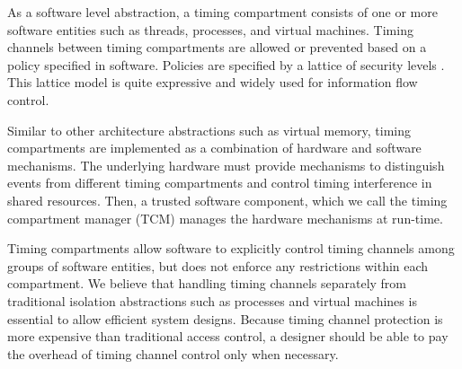 As a software level abstraction, a timing compartment consists of one or more 
software entities such as threads, processes, and virtual machines.  Timing 
channels between timing compartments are allowed or prevented based on a policy 
specified in software.  Policies are specified by a lattice of security levels
\cite{denning}.
This lattice model is quite expressive and widely used for information flow 
control. 


Similar to other architecture abstractions such as virtual memory,
timing compartments are implemented as a combination of hardware and software
mechanisms. The underlying hardware must provide mechanisms to distinguish
events from different timing compartments and control timing interference in 
shared resources. Then, a trusted software component, which we call the timing 
compartment manager (TCM) manages the hardware mechanisms at run-time.


Timing compartments allow software to explicitly control timing channels
among groups of software entities, but does not enforce any restrictions within
each compartment. We believe that handling timing channels separately from
traditional isolation abstractions such as processes and virtual machines is 
essential to allow efficient system designs. Because timing channel protection
is more expensive than traditional access control, a designer should be able
to pay the overhead of timing channel control only when necessary.

